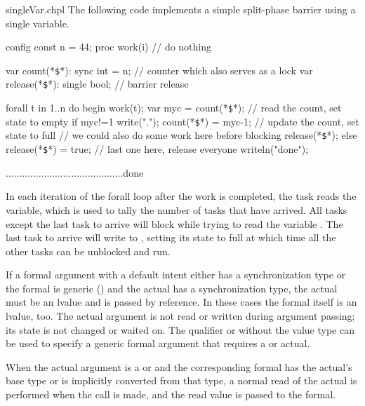 \begin{chapelexample}{singleVar.chpl}
The following code implements a simple split-phase barrier using a
single variable.
\begin{chapelpre}
config const n = 44;
proc work(i) {
  // do nothing
}
\end{chapelpre}
\begin{chapel}
var count(*\texttt{\$}*): sync int = n;  // counter which also serves as a lock
var release(*\texttt{\$}*): single bool; // barrier release

forall t in 1..n do begin {
  work(t);
  var myc = count(*\texttt{\$}*);  // read the count, set state to empty
  if myc!=1 {
    write(".");
    count(*\texttt{\$}*) = myc-1;  // update the count, set state to full
    // we could also do some work here before blocking
    release(*\texttt{\$}*);
  } else {
    release(*\texttt{\$}*) = true;  // last one here, release everyone
    writeln("done");
  }
}
\end{chapel}
\begin{chapeloutput}
...........................................done
\end{chapeloutput}
In each iteration of the forall loop after the work is completed, the
task reads the  variable, which is
used to tally the number of tasks that have arrived.  All tasks except
the last task to arrive will block while trying to read the
variable .  The last task to arrive
will write to , setting its state to
full at which time all the other tasks can be unblocked and run.
\end{chapelexample}

If a formal argument with a default intent either has a synchronization
type or the formal is generic ()
and the actual has a synchronization type, the actual must be an
lvalue and is passed by reference. In these cases the formal itself
is an lvalue, too. The actual argument is not read or written during
argument passing; its state is not changed or waited on. The qualifier
 or  without the value type can be used to
specify a generic formal argument that requires a 
or  actual.

When the actual argument is a  or  and the
corresponding formal has the actual's base type or is implicitly
converted from that type, a normal read of the actual is performed
when the call is made, and the read value is passed to the formal.


